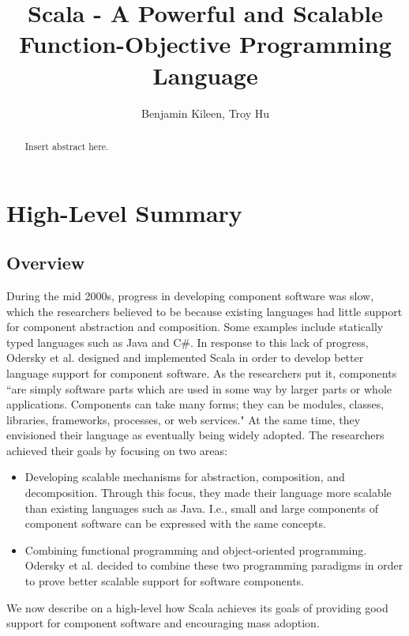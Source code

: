 \documentclass[jou,apacite]{IEEEtran}
\title{Scala - A Powerful and Scalable Function-Objective Programming Language}
\author{Benjamin Kileen, Troy Hu}
\begin{document}
\maketitle    
\begin{abstract}
Insert abstract here.
\end{abstract}                     
\section{\textbf{High-Level Summary}}
\subsection{Overview}
During the mid 2000s, progress in developing component software was slow, which the researchers believed to be because existing languages had little support for component abstraction and composition. Some examples include statically typed languages such as Java and C\#. In response to this lack of progress, Odersky et al. designed and implemented Scala in order to develop better language support for component software. As the researchers put it, components ``are simply software parts which are used in some way by larger parts or whole applications. Components can take many forms; they can be modules, classes, libraries, frameworks, processes, or web services." At the same time, they envisioned their language as eventually being widely adopted. 
\newline\newline
The researchers achieved their goals by focusing on two areas: 
    \begin{itemize}
        \item Developing scalable mechanisms for abstraction, composition, and decomposition. Through this focus, they made their language more scalable than existing languages such as Java. I.e., small and large components of component software can be  expressed with the same concepts.
        \item Combining functional programming and object-oriented programming. Odersky et al. decided to combine these two programming paradigms in order to prove better scalable support for software components.
    \end{itemize}
We now describe on a high-level how Scala achieves its goals of providing good support for component software and encouraging mass adoption.
\end{document}
